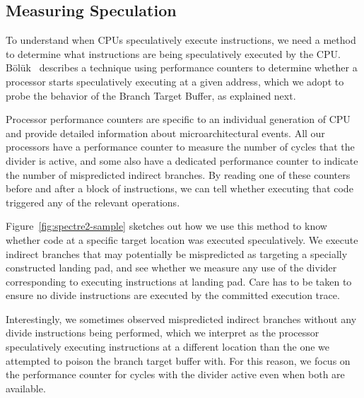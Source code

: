 \subsection{Measuring Speculation}

To understand when CPUs speculatively execute instructions, we need a
method to determine what instructions are being speculatively executed
by the CPU.  Bölük~\cite{speculating-x86} describes a technique using
performance counters to determine whether a processor starts
speculatively executing at a given address, which we adopt to probe
the behavior of the Branch Target Buffer, as explained next.

Processor performance counters are specific to an individual generation of CPU and provide detailed information about microarchitectural events.
All our processors have a performance counter to measure the number of cycles that the divider is active, and some also have a dedicated performance counter to indicate the number of mispredicted indirect branches.
By reading one of these counters before and after a block of instructions, we can tell whether executing that code triggered any of the relevant operations.

Figure~\ref{fig:spectre2-sample} sketches out how we use this method to know whether code at a specific target location was executed speculatively.
We execute indirect branches that may potentially be mispredicted as targeting a specially constructed landing pad, and see whether we measure any use of the divider corresponding to executing instructions at landing pad.
Care has to be taken to ensure no divide instructions are executed by the committed execution trace.

Interestingly, we sometimes observed mispredicted indirect branches without any divide instructions being performed, which we interpret as the processor speculatively executing instructions at a different location than the one we attempted to poison the branch target buffer with.
For this reason, we focus on the performance counter for cycles with the divider active even when both are available.



